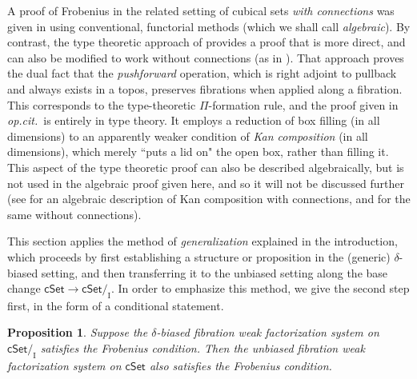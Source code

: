 \documentclass[12pt]{article}
\newcommand{\opcit}{\emph{op.cit.}}
\newcommand{\cSet}{\ensuremath{\mathsf{cSet}}}
\renewcommand{\to}{\ensuremath{\rightarrow}}
\newcommand{\I}{\ensuremath{\mathrm{I}}}
\newtheorem{proposition}[theorem]{Proposition}
\theoremstyle{remark}
\theoremstyle{definition}
\begin{document}
A proof of Frobenius in the related setting of cubical sets \emph{with connections} was given in \cite{GS} using conventional, functorial methods (which we shall call \emph{algebraic}).  By contrast, the type theoretic approach of \cite{CCHM} provides a proof that is more direct, and can also be modified to work without connections (as in \cite{AXYZ}).  That approach proves the dual fact that the \emph{pushforward} operation, which is right adjoint to pullback and always exists in a topos, preserves fibrations when applied along a fibration.  This corresponds to the type-theoretic $\Pi$-formation rule, and the proof given in \opcit\ is entirely in type theory.  It employs a reduction of box filling (in all dimensions) to an apparently weaker condition of \emph{Kan composition} (in all dimensions), which merely ``puts a lid on" the open box, rather than filling it.  This aspect of the type theoretic proof can also be described algebraically, but is not used in the algebraic proof given here, and so it will not be discussed further (see \cite{LOPS} for an algebraic description of Kan composition with connections, and \cite{A:composition,filling,Frobenius,etc} for the same without connections).

This section applies the method of \emph{generalization} explained in the introduction, which proceeds by first establishing a structure or proposition in the (generic) $\delta$-biased setting, and then transferring it to the unbiased setting along the base change $\cSet\to\cSet/_\I$.  In order to emphasize this method, we give the second step first, in the form of a conditional statement.

\begin{proposition}\label{prop:biasedFrobimpliesunbiasedFrob}
Suppose the $\delta$-biased fibration weak factorization system on $\cSet/_\I$ satisfies the Frobenius condition. Then the unbiased fibration weak factorization system on $\cSet$ also satisfies the Frobenius condition.
\end{proposition}
\end{document}
